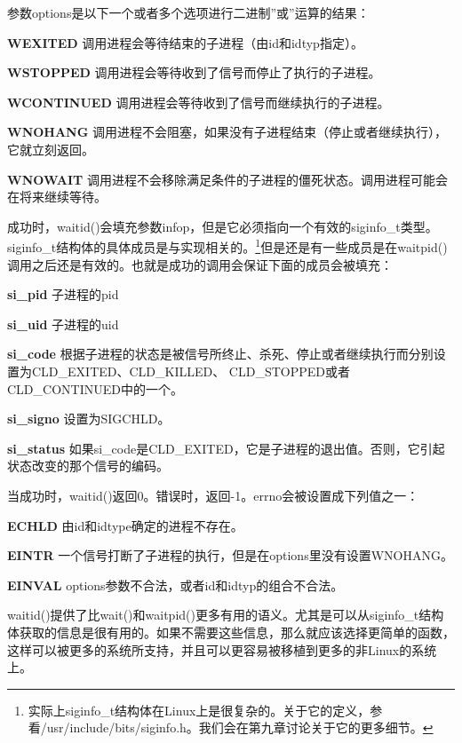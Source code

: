 参数options是以下一个或者多个选项进行二进制''或''运算的结果：

\begin{eqlist*}
\item[\textbf{WEXITED}] 调用进程会等待结束的子进程（由id和idtyp指定）。
\item[\textbf{WSTOPPED}] 调用进程会等待收到了信号而停止了执行的子进程。
\item[\textbf{WCONTINUED}] 调用进程会等待收到了信号而继续执行的子进程。
\item[\textbf{WNOHANG}] 调用进程不会阻塞，如果没有子进程结束（停止或者继续执行），它就立刻返回。
\item[\textbf{WNOWAIT}] 调用进程不会移除满足条件的子进程的僵死状态。调用进程可能会在将来继续等待。
\end{eqlist*}

成功时，waitid()会填充参数infop，但是它必须指向一个有效的siginfo\_t类型。siginfo\_t结构体的具体成员是与实现相关的。\footnote[1]{实际上siginfo\_t结构体在Linux上是很复杂的。关于它的定义，参看/usr/include/bits/siginfo.h。我们会在第九章讨论关于它的更多细节。}但是还是有一些成员是在waitpid()调用之后还是有效的。也就是成功的调用会保证下面的成员会被填充：

\begin{eqlist*}
\item[\textbf{si\_pid}] 子进程的pid
\item[\textbf{si\_uid}] 子进程的uid
\item[\textbf{si\_code}] 根据子进程的状态是被信号所终止、杀死、停止或者继续执行而分别设置为CLD\_EXITED、CLD\_KILLED、 CLD\_STOPPED或者CLD\_CONTINUED中的一个。
\item[\textbf{si\_signo}] 设置为SIGCHLD。
\item[\textbf{si\_status}] 如果si\_code是CLD\_EXITED，它是子进程的退出值。否则，它引起状态改变的那个信号的编码。
\end{eqlist*}

当成功时，waitid()返回0。错误时，返回-1。errno会被设置成下列值之一：

\begin{eqlist*}
\item[\textbf{ECHLD}] 由id和idtype确定的进程不存在。
\item[\textbf{EINTR}] 一个信号打断了子进程的执行，但是在options里没有设置WNOHANG。
\item[\textbf{EINVAL}] options参数不合法，或者id和idtyp的组合不合法。
\end{eqlist*}

waitid()提供了比wait()和waitpid()更多有用的语义。尤其是可以从siginfo\_t结构体获取的信息是很有用的。如果不需要这些信息，那么就应该选择更简单的函数，这样可以被更多的系统所支持，并且可以更容易被移植到更多的非Linux的系统上。

